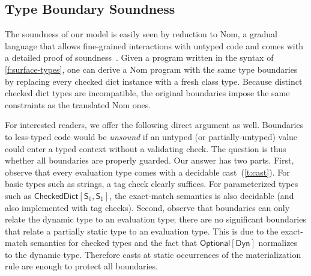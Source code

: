 \documentclass[english,cleveref,submission]{programming}
\newcommand{\code}[1]{\texttt{#1}}
\newcommand{\spapp}[2]{#1\,(#2)}
\newcommand{\spann}[2]{#1\!:\!#2}
\newcommand{\typefont}[1]{\mathsf{#1}}
\newcommand{\codefont}[1]{\emph{#1}}
\newcommand{\paramtype}[2]{#1[#2]}
\newcommand{\spteval}{\typefont{S}}
\newcommand{\sptclass}{\typefont{C}}
\newcommand{\sptdyn}{\typefont{Dyn}}
\newcommand{\sptoptional}[1]{\paramtype{\typefont{Optional}}{#1}}
\newcommand{\sptrawchkdict}{\typefont{CheckedDict}} %
\newcommand{\sptchkdict}[2]{\paramtype{\sptrawchkdict}{#1, #2}}
\newcommand{\sptenv}{\typefont{Env}}
\newcommand{\sptvardef}[2]{\spann{#1}{#2}}
\newcommand{\spx}{\code{x}}
\newcommand{\spf}{\code{f}}
\newcommand{\spc}{\sptclass}
\newcommand{\spexpr}{\codefont{expr}}
\newcommand{\vdashsub}[1]{\vdash_{#1}}
\newcommand{\wtprog}{\vdashsub{\mathbf{P}}}
\newcommand{\wtexpr}{\vdashsub{\mathbf{E}}}
\newcommand{\spvardef}[3]{\sptvardef{#1}{#2} = #3}
\newcommand{\spfundef}[4]{\mathrm{def}~\spapp{#1}{#2}\code{ -> }#3: #4}
\newcommand{\spclassdef}[4]{\mathrm{class}~\spapp{#1}{#2}:~#3;~#4}
\newcommand{\spself}{\code{self}}
\begin{document}
%


\subsection{Type Boundary Soundness}
\label{s:ts}

The soundness of our model is easily seen by reduction to Nom, a gradual
language that allows fine-grained interactions with untyped code and comes with
a detailed proof of soundness~\cite{mt-oopsla-2017,mt-oopsla-2021}.
Given a program written in the syntax of \cref{f:surface-types}, one can derive
a Nom program with the same type boundaries by replacing every checked
dict instance with a fresh class type.
Because distinct checked dict types are incompatible, the
original boundaries impose the same constraints as the translated Nom ones.

For interested readers, we offer the following direct argument as well.
Boundaries to less-typed code would be \emph{unsound} if an untyped
(or partially-untyped) value could enter a typed context without
a validating check.
The question is thus whether all boundaries are properly guarded.
Our answer has two parts.
First, observe that every evaluation type comes with a decidable
cast~(\cref{t:cast}).
For basic types such as strings, a tag check clearly suffices.
For parameterized types such as $\sptchkdict{\spteval_0}{\spteval_1}$,
the exact-match semantics is also decidable (and also implemented with
tag checks).
Second, observe that boundaries can only relate the dynamic type to an
evaluation type; there are no significant boundaries that relate a partially
static type to an evaluation type.
This is due to the exact-match semantics for checked types and the fact that
$\sptoptional{\sptdyn}$ normalizes to the dynamic type.
Therefore casts at static occurrences of the materialization rule are
enough to protect all boundaries.
\end{document}
